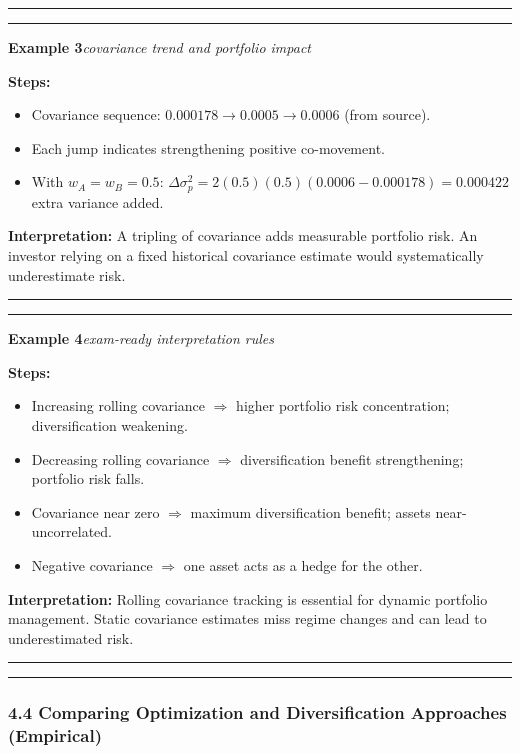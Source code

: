 \documentclass[
]{article}
\begin{document}
\noindent\rule{\linewidth}{0.4pt}
\medskip
\noindent\rule{\linewidth}{0.4pt}
\noindent\textbf{Example 3}\enspace\textit{covariance trend and portfolio impact}

\noindent\textbf{Steps:}
\begin{itemize}\setlength{\itemsep}{3pt}
  \item Covariance sequence: $0.000178 \to 0.0005 \to 0.0006$ (from source).
  \item Each jump indicates strengthening positive co-movement.
  \item With $w_A=w_B=0.5$: $\Delta\sigma_p^2 = 2(0.5)(0.5)(0.0006-0.000178) = 0.000422$ extra variance added.
\end{itemize}

\noindent\textbf{Interpretation:} A tripling of covariance adds measurable portfolio risk. An investor relying on a fixed historical covariance estimate would systematically underestimate risk.

\noindent\rule{\linewidth}{0.4pt}
\medskip
\noindent\rule{\linewidth}{0.4pt}
\noindent\textbf{Example 4}\enspace\textit{exam-ready interpretation rules}

\noindent\textbf{Steps:}
\begin{itemize}\setlength{\itemsep}{3pt}
  \item Increasing rolling covariance $\Rightarrow$ higher portfolio risk concentration; diversification weakening.
  \item Decreasing rolling covariance $\Rightarrow$ diversification benefit strengthening; portfolio risk falls.
  \item Covariance near zero $\Rightarrow$ maximum diversification benefit; assets near-uncorrelated.
  \item Negative covariance $\Rightarrow$ one asset acts as a hedge for the other.
\end{itemize}

\noindent\textbf{Interpretation:} Rolling covariance tracking is essential for dynamic portfolio management. Static covariance estimates miss regime changes and can lead to underestimated risk.

\noindent\rule{\linewidth}{0.4pt}
\medskip

\begin{center}\rule{0.5\linewidth}{0.5pt}\end{center}

\hypertarget{comparing-optimization-and-diversification-approaches-empirical}{%
\subsubsection{4.4 Comparing Optimization and Diversification Approaches
(Empirical)}\label{comparing-optimization-and-diversification-approaches-empirical}}
\end{document}
